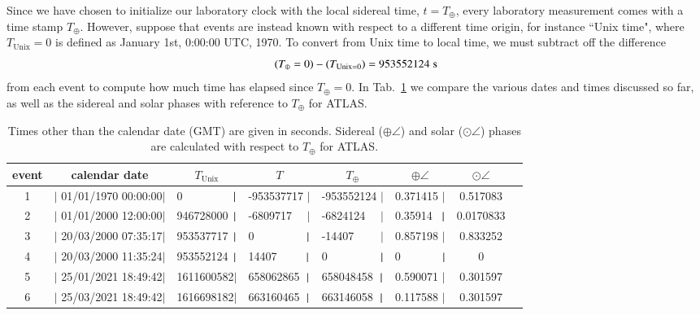 Since we have chosen to initialize our laboratory clock
with the local sidereal time, $t = T_\oplus$, 
every laboratory measurement comes with a time stamp $T_\oplus$.
However, suppose that events are instead known with 
respect to a different time origin, for instance
``Unix time", where $T_{\text{Unix}} = 0$ is defined as January 
1st, 0:00:00 UTC, 1970. To convert from Unix time to local time,
we must subtract off the difference
\begin{equation}
\label{Tshift}
(T_\oplus = 0) - (T_{\text{Unix} = 0}) = 953552124\;\text s
\end{equation}
from each event to compute how much time has elapsed since $T_\oplus = 0$. 
In Tab.~\ref{tab:datestimes} we 
compare the various dates and times discussed so far, as well as the sidereal
and solar phases with reference to $T_\oplus$ for ATLAS. 
%
\begin{table}
\centering 
\small
\begin{tabular}{c c c c c c c c} %
\hline\hline
event & calendar date & $T_{\text{Unix}}$
& $T$ & $T_\oplus$ & $\oplus\angle$ & $\odot\angle$ \\
\hline
1&$|$ 01/01/1970 00:00:00$|$& 0 $\qquad\qquad\hspace{.5mm}|$& -953537717
$|$& -953552124 $|$& 0.371415 $|$&  0.517083 \\
%
2&$|$ 01/01/2000 12:00:00$|$& 946728000 $\hspace{.5mm}|$& -6809717 $\quad|$& -6824124 $\quad|$& 0.35914 $\hspace{1.75mm}|$& 0.0170833\\
%
3&$|$ 20/03/2000 07:35:17$|$& 953537717 $\hspace{.5mm}|$& 0 $\qquad\qquad\hspace{1.0mm}|$& -14407 $\qquad|$& 0.857198 $|$& 0.833252\\
%
4&$|$ 20/03/2000 11:35:24$|$& 953552124 $\hspace{.5mm}|$& 14407 $\qquad\hspace{1mm}|$& 0 $\qquad\qquad\hspace{1mm}|$& 0 $\qquad\quad\hspace{1mm}|$& 0\\
%
5&$|$ 25/01/2021 18:49:42$|$& 1611600582$|$& 658062865  $\hspace{1mm}|$& 658048458 $\hspace{1mm}|$& 0.590071 $|$& 0.301597 \\
%
6&$|$ 25/03/2021 18:49:42$|$& 1616698182$|$& 663160465 $\hspace{1mm}|$& 663146058 $\hspace{1mm}|$& 0.117588 $|$& 0.301597 \\
\hline\hline 
\end{tabular}
\caption{Times other than the calendar date (GMT) are given in seconds. Sidereal ($\oplus\angle$) and solar ($\odot\angle$) phases are calculated
with respect to $T_\oplus$ for ATLAS.}
\label{tab:datestimes}
\end{table}
